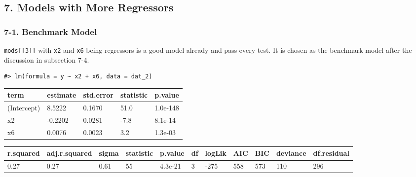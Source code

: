 \documentclass[a4paper]{article}
\begin{document}
\hypertarget{models-with-more-regressors}{%
\subsection{7. Models with More
Regressors}\label{models-with-more-regressors}}

\hypertarget{benchmark-model}{%
\subsubsection{7-1. Benchmark Model}\label{benchmark-model}}

\texttt{mods{[}{[}3{]}{]}} with \texttt{x2} and \texttt{x6} being
regressors is a good model already and pass every test. It is chosen as
the benchmark model after the discussion in subsection 7-4.

\begin{verbatim}
#> lm(formula = y ~ x2 + x6, data = dat_2)
\end{verbatim}

\begin{table}[H]
\centering
\begin{tabular}{lllll}
\toprule
term & estimate & std.error & statistic & p.value\\
\midrule
(Intercept) & 8.5222 & 0.1670 & 51.0 & 1.0e-148\\
x2 & -0.2202 & 0.0281 & -7.8 & 8.1e-14\\
x6 & 0.0076 & 0.0023 & 3.2 & 1.3e-03\\
\bottomrule
\end{tabular}
\end{table}

\begin{table}[H]
\centering
\begin{tabular}{lllllllllll}
\toprule
r.squared & adj.r.squared & sigma & statistic & p.value & df & logLik & AIC & BIC & deviance & df.residual\\
\midrule
0.27 & 0.27 & 0.61 & 55 & 4.3e-21 & 3 & -275 & 558 & 573 & 110 & 296\\
\bottomrule
\end{tabular}
\end{table}
\end{document}
